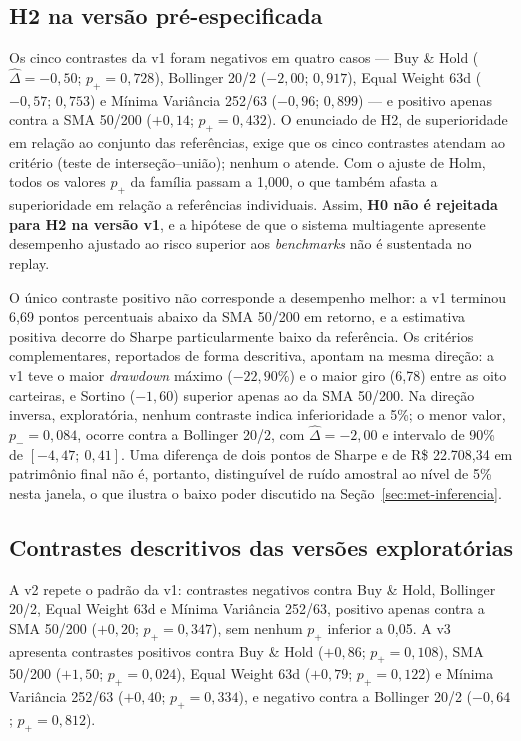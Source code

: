 \documentclass{eic-bcc-tcc}
\begin{document}
\subsection{H2 na versão pré-especificada}
\label{sec:res-h2}

Os cinco contrastes da v1 foram negativos em quatro casos --- Buy \& Hold ($\hat{\Delta} = -0{,}50$; $p_{+} = 0{,}728$), Bollinger 20/2 ($-2{,}00$; $0{,}917$), Equal Weight 63d ($-0{,}57$; $0{,}753$) e Mínima Variância 252/63 ($-0{,}96$; $0{,}899$) --- e positivo apenas contra a SMA 50/200 ($+0{,}14$; $p_{+} = 0{,}432$). O enunciado de H2, de superioridade em relação ao conjunto das referências, exige que os cinco contrastes atendam ao critério (teste de interseção--união); nenhum o atende. Com o ajuste de Holm, todos os valores $p_{+}$ da família passam a 1,000, o que também afasta a superioridade em relação a referências individuais. Assim, \textbf{H0 não é rejeitada para H2 na versão v1}, e a hipótese de que o sistema multiagente apresente desempenho ajustado ao risco superior aos \textit{benchmarks} não é sustentada no replay.

O único contraste positivo não corresponde a desempenho melhor: a v1 terminou 6,69 pontos percentuais abaixo da SMA 50/200 em retorno, e a estimativa positiva decorre do Sharpe particularmente baixo da referência. Os critérios complementares, reportados de forma descritiva, apontam na mesma direção: a v1 teve o maior \textit{drawdown} máximo ($-22{,}90\%$) e o maior giro (6,78) entre as oito carteiras, e Sortino ($-1{,}60$) superior apenas ao da SMA 50/200. Na direção inversa, exploratória, nenhum contraste indica inferioridade a 5\%; o menor valor, $p_{-} = 0{,}084$, ocorre contra a Bollinger 20/2, com $\hat{\Delta} = -2{,}00$ e intervalo de 90\% de $[-4{,}47;\ 0{,}41]$. Uma diferença de dois pontos de Sharpe e de R\$ 22.708,34 em patrimônio final não é, portanto, distinguível de ruído amostral ao nível de 5\% nesta janela, o que ilustra o baixo poder discutido na Seção~\ref{sec:met-inferencia}.

\subsection{Contrastes descritivos das versões exploratórias}
\label{sec:res-h2-exploratorio}

A v2 repete o padrão da v1: contrastes negativos contra Buy \& Hold, Bollinger 20/2, Equal Weight 63d e Mínima Variância 252/63, positivo apenas contra a SMA 50/200 ($+0{,}20$; $p_{+} = 0{,}347$), sem nenhum $p_{+}$ inferior a 0,05. A v3 apresenta contrastes positivos contra Buy \& Hold ($+0{,}86$; $p_{+} = 0{,}108$), SMA 50/200 ($+1{,}50$; $p_{+} = 0{,}024$), Equal Weight 63d ($+0{,}79$; $p_{+} = 0{,}122$) e Mínima Variância 252/63 ($+0{,}40$; $p_{+} = 0{,}334$), e negativo contra a Bollinger 20/2 ($-0{,}64$; $p_{+} = 0{,}812$).
\end{document}
